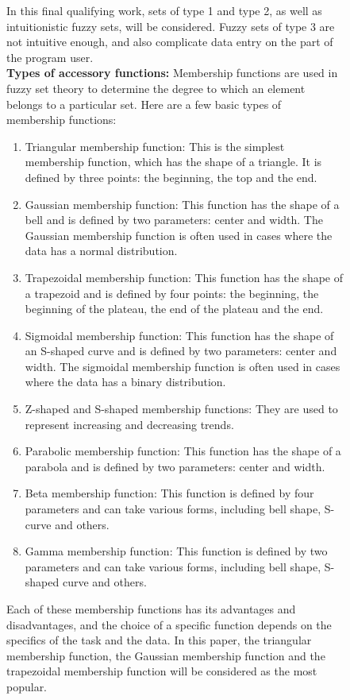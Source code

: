 \documentclass{article}
\begin{document}
\begin{figure}[!t]
\begin{minipage}{0.49\textwidth}
            In this final qualifying work, sets of type 1 and type 2, as well as intuitionistic fuzzy sets, will be considered. Fuzzy sets of type 3 are not intuitive enough, and also complicate data entry on the part of the program user.\\
            \textbf{Types of accessory functions:}
            Membership functions are used in fuzzy set theory to determine the degree to which an element belongs to a particular set. Here are a few basic types of membership functions:
            \begin{enumerate}
                \item Triangular membership function: This is the simplest membership function, which has the shape of a triangle. It is defined by three points: the beginning, the top and the end.
                \item Gaussian membership function: This function has the shape of a bell and is defined by two parameters: center and width. The Gaussian membership function is often used in cases where the data has a normal distribution.
                \item Trapezoidal membership function: This function has the shape of a trapezoid and is defined by four points: the beginning, the beginning of the plateau, the end of the plateau and the end.
                \item Sigmoidal membership function: This function has the shape of an S-shaped curve and is defined by two parameters: center and width. The sigmoidal membership function is often used in cases where the data has a binary distribution.
                \item Z-shaped and S-shaped membership functions: They are used to represent increasing and decreasing trends.
                \item Parabolic membership function: This function has the shape of a parabola and is defined by two parameters: center and width.
                \item Beta membership function: This function is defined by four parameters and can take various forms, including bell shape, S-curve and others.
                \item Gamma membership function: This function is defined by two parameters and can take various forms, including bell shape, S-shaped curve and others.
            \end{enumerate}
            Each of these membership functions has its advantages and disadvantages, and the choice of a specific function depends on the specifics of the task and the data. In this paper, the triangular membership function, the Gaussian membership function and the trapezoidal membership function will be considered as the most popular.\\

\end{minipage}
\end{figure}
\end{document}
